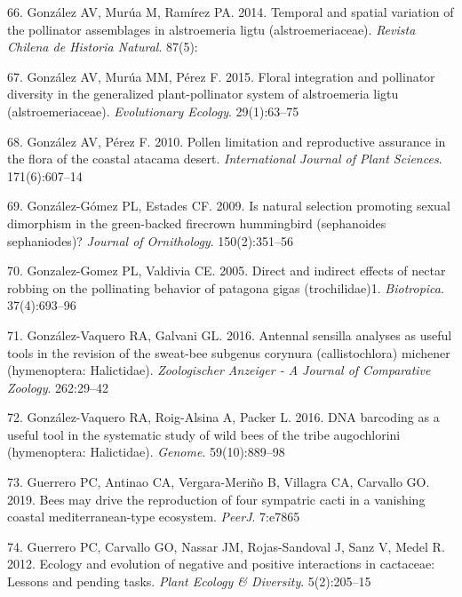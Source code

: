 \documentclass[
]{article}
\begin{document}
\leavevmode\hypertarget{ref-RN123}{}%
66. González AV, Murúa M, Ramírez PA. 2014. Temporal and spatial
variation of the pollinator assemblages in alstroemeria ligtu
(alstroemeriaceae). \emph{Revista Chilena de Historia Natural}. 87(5):

\leavevmode\hypertarget{ref-RN124}{}%
67. González AV, Murúa MM, Pérez F. 2015. Floral integration and
pollinator diversity in the generalized plant-pollinator system of
alstroemeria ligtu (alstroemeriaceae). \emph{Evolutionary Ecology}.
29(1):63--75

\leavevmode\hypertarget{ref-RN122}{}%
68. González AV, Pérez F. 2010. Pollen limitation and reproductive
assurance in the flora of the coastal atacama desert.
\emph{International Journal of Plant Sciences}. 171(6):607--14

\leavevmode\hypertarget{ref-RN40}{}%
69. González-Gómez PL, Estades CF. 2009. Is natural selection promoting
sexual dimorphism in the green-backed firecrown hummingbird (sephanoides
sephaniodes)? \emph{Journal of Ornithology}. 150(2):351--56

\leavevmode\hypertarget{ref-RN125}{}%
70. Gonzalez-Gomez PL, Valdivia CE. 2005. Direct and indirect effects of
nectar robbing on the pollinating behavior of patagona gigas
(trochilidae)1. \emph{Biotropica}. 37(4):693--96

\leavevmode\hypertarget{ref-RN41}{}%
71. González-Vaquero RA, Galvani GL. 2016. Antennal sensilla analyses as
useful tools in the revision of the sweat-bee subgenus corynura
(callistochlora) michener (hymenoptera: Halictidae). \emph{Zoologischer
Anzeiger - A Journal of Comparative Zoology}. 262:29--42

\leavevmode\hypertarget{ref-RN42}{}%
72. González-Vaquero RA, Roig-Alsina A, Packer L. 2016. DNA barcoding as
a useful tool in the systematic study of wild bees of the tribe
augochlorini (hymenoptera: Halictidae). \emph{Genome}. 59(10):889--98

\leavevmode\hypertarget{ref-RN44}{}%
73. Guerrero PC, Antinao CA, Vergara-Meriño B, Villagra CA, Carvallo GO.
2019. Bees may drive the reproduction of four sympatric cacti in a
vanishing coastal mediterranean-type ecosystem. \emph{PeerJ}. 7:e7865

\leavevmode\hypertarget{ref-RN43}{}%
74. Guerrero PC, Carvallo GO, Nassar JM, Rojas-Sandoval J, Sanz V, Medel
R. 2012. Ecology and evolution of negative and positive interactions in
cactaceae: Lessons and pending tasks. \emph{Plant Ecology \& Diversity}.
5(2):205--15
\end{document}
